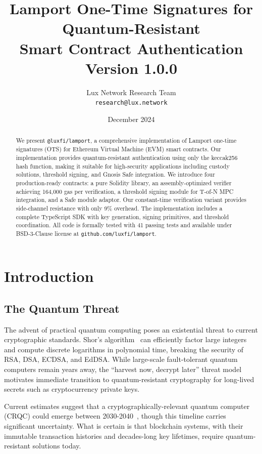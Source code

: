 \documentclass[11pt,a4paper]{article}
\title{Lamport One-Time Signatures for Quantum-Resistant\\Smart Contract Authentication\\[0.5em]\large{Version 1.0.0}}
\author{Lux Network Research Team\\
\texttt{research@lux.network}}
\date{December 2024}
\begin{document}
\maketitle

\begin{abstract}
We present \texttt{@luxfi/lamport}, a comprehensive implementation of Lamport one-time signatures (OTS) for Ethereum Virtual Machine (EVM) smart contracts. Our implementation provides quantum-resistant authentication using only the keccak256 hash function, making it suitable for high-security applications including custody solutions, threshold signing, and Gnosis Safe integration. We introduce four production-ready contracts: a pure Solidity library, an assembly-optimized verifier achieving 164,000 gas per verification, a threshold signing module for T-of-N MPC integration, and a Safe module adaptor. Our constant-time verification variant provides side-channel resistance with only 9\% overhead. The implementation includes a complete TypeScript SDK with key generation, signing primitives, and threshold coordination. All code is formally tested with 41 passing tests and available under BSD-3-Clause license at \texttt{github.com/luxfi/lamport}.
\end{abstract}

\tableofcontents
\newpage

\section{Introduction}

\subsection{The Quantum Threat}

The advent of practical quantum computing poses an existential threat to current cryptographic standards. Shor's algorithm~\cite{shor1994} can efficiently factor large integers and compute discrete logarithms in polynomial time, breaking the security of RSA, DSA, ECDSA, and EdDSA. While large-scale fault-tolerant quantum computers remain years away, the ``harvest now, decrypt later'' threat model motivates immediate transition to quantum-resistant cryptography for long-lived secrets such as cryptocurrency private keys.

Current estimates suggest that a cryptographically-relevant quantum computer (CRQC) could emerge between 2030-2040~\cite{mosca2018}, though this timeline carries significant uncertainty. What is certain is that blockchain systems, with their immutable transaction histories and decades-long key lifetimes, require quantum-resistant solutions today.
\end{document}
